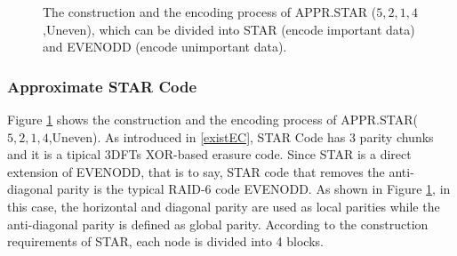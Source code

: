 \documentclass[sigconf]{acmart}
\begin{document}
\begin{figure}[ht]
\caption{The construction and the encoding process of APPR.STAR ($5,2,1,4$,Uneven), which can be divided into STAR (encode important data) and EVENODD (encode unimportant data).}
\label{fig-ap-5214}
\end{figure}


\subsubsection{Approximate STAR Code}
Figure \ref{fig-ap-5214} shows the construction and the encoding process of APPR.STAR($5,2,1,4$,Uneven).
As introduced in \ref{existEC}, STAR Code \cite{STAR} has 3 parity chunks and it is a tipical 3DFTs XOR-based erasure code.
Since STAR is a direct extension of EVENODD\cite{EVENODD}, that is to say, STAR code that removes the anti-diagonal parity is the typical RAID-6 code EVENODD. As shown in Figure \ref{fig-ap-5214}, in this case, the horizontal and diagonal parity are used as local parities while the anti-diagonal parity is defined as global parity.
According to the construction requirements of STAR, each node is divided into 4 blocks.
\end{document}
